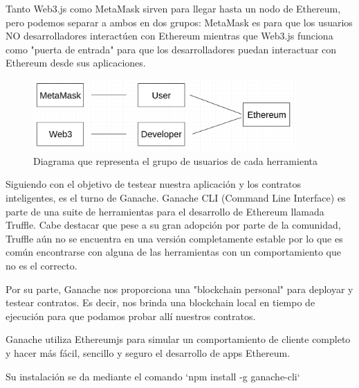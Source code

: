 Tanto Web3.js como MetaMask sirven para llegar hasta un nodo de Ethereum, pero podemos separar 
a ambos en dos grupos: MetaMask es para que los usuarios NO desarrolladores interactúen con 
Ethereum mientras que Web3.js funciona como "puerta de entrada" para que los desarrolladores
puedan interactuar con Ethereum desde sus aplicaciones.

\begin{figure}[htbp!] 
\centering    
\includegraphics[width=0.9\textwidth]{metaweb3}
\caption[MetaWeb3]{Diagrama que representa el grupo de usuarios de cada herramienta}
\label{fig:metamask-web3}
\end{figure}


Siguiendo con el objetivo de testear nuestra aplicación y los contratos inteligentes, es el turno 
de Ganache. Ganache CLI (Command Line Interface) es parte de una suite de herramientas para el 
desarrollo de Ethereum llamada Truffle. Cabe destacar que pese a su gran adopción por parte de la 
comunidad, Truffle aún no se encuentra en una versión completamente estable por lo que es común
encontrarse con alguna de las herramientas con un comportamiento que no es el correcto.

Por su parte, Ganache nos proporciona una "blockchain personal" para deployar y testear contratos.
Es decir, nos brinda una blockchain local en tiempo de ejecución para que podamos probar allí
nuestros contratos.

Ganache utiliza Ethereumjs para simular un comportamiento de cliente completo y hacer más fácil,
sencillo y seguro el desarrollo de apps Ethereum.

Su instalación se da mediante el comando `npm install -g ganache-cli`
